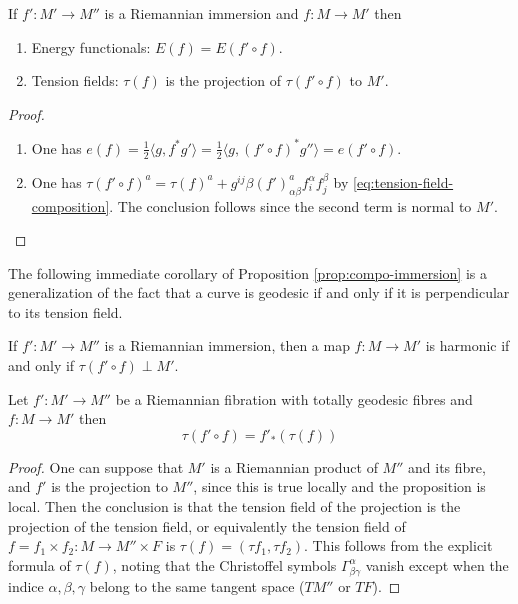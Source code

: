 \begin{proposition}
\label{prop:compo-immersion}
If \(f': M' \longrightarrow M''\) is a Riemannian immersion and \(f: M \longrightarrow
M'\) then 
\begin{enumerate}
\item Energy functionals: \(E(f) = E(f'\circ f)\).
\item Tension fields: \(\tau(f)\) is the projection of \(\tau(f'\circ f)\) to \(M'\).
\end{enumerate}
\end{proposition}
\begin{proof}
\begin{enumerate}
\item One has \(e(f) = \frac{1}{2}\langle g, f^* g' \rangle  = \frac{1}{2}\langle g,
   (f'\circ f)^* g'' \rangle = e(f'\circ f)\).
\item One has \(\tau(f'\circ f)^a  = \tau(f)^a +
   g^{ij}\beta(f')^a_{\alpha\beta} f^\alpha_i f^\beta_j\) by
\eqref{eq:tension-field-composition}. The conclusion follows since the second term is normal to \(M'\).
\end{enumerate}
\end{proof}

The following immediate corollary of Proposition \ref{prop:compo-immersion} is a generalization of the fact that a curve is geodesic if and only if it
is perpendicular to its tension field.

\begin{corollary}
If \(f': M' \longrightarrow M''\) is a Riemannian immersion, then a map \(f: M \longrightarrow M'\) is harmonic if and only if \(\tau(f'\circ f) \perp M'\).
\end{corollary}


\iffalse


\begin{proposition}
\label{prop:compo-submersion}
Let \(f': M' \longrightarrow M''\) be a Riemannian fibration with totally geodesic
fibres and \(f: M \longrightarrow M'\) then 
\[
\tau(f'\circ f) = f'_*(\tau(f))  
\]
\end{proposition}

\begin{proof}
One can suppose that \(M'\) is a Riemannian product of \(M''\) and its fibre, and
\(f'\) is the projection to \(M''\), since this is true locally and the proposition is
local. Then the conclusion is that the tension field of the projection is the projection
of the tension field, or equivalently the tension field of \(f= f_1\times f_2: M \longrightarrow
M''\times F\) is \(\tau(f) = (\tau f_1,\tau f_2)\). This follows from the explicit
formula of \(\tau(f)\), noting that the Christoffel symbols \(\Gamma^\alpha_{\beta\gamma}\) vanish except when the indice \(\alpha,\beta,\gamma\)
belong to the same tangent space (\(TM''\) or \(TF\)).
\end{proof}

